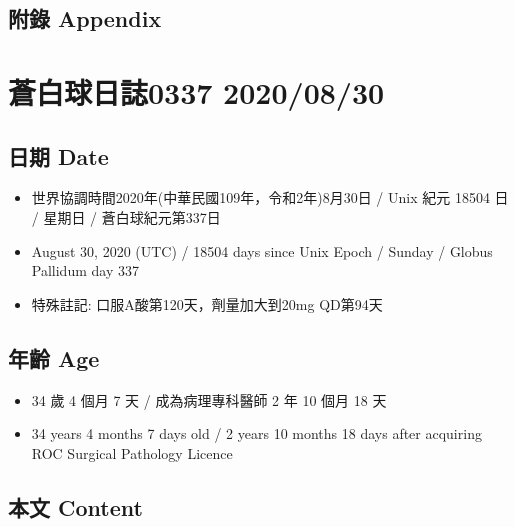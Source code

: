 \documentclass[a5paper, 11pt
]{book}
\providecommand{\tightlist}{%
  \setlength{\itemsep}{0pt}\setlength{\parskip}{0pt}}
\begin{document}
\hypertarget{ux9644ux9304-appendix-89}{%
\subsection{附錄 Appendix}\label{ux9644ux9304-appendix-89}}

\hypertarget{ux84bcux767dux7403ux65e5ux8a8c0337-20200830}{%
\section{蒼白球日誌0337
2020/08/30}\label{ux84bcux767dux7403ux65e5ux8a8c0337-20200830}}

\hypertarget{ux65e5ux671f-date-90}{%
\subsection{日期 Date}\label{ux65e5ux671f-date-90}}

\begin{itemize}
\tightlist
\item
  世界協調時間2020年(中華民國109年，令和2年)8月30日 / Unix 紀元 18504 日
  / 星期日 / 蒼白球紀元第337日
\item
  August 30, 2020 (UTC) / 18504 days since Unix Epoch / Sunday / Globus
  Pallidum day 337
\item
  特殊註記: 口服A酸第120天，劑量加大到20mg QD第94天
\end{itemize}

\hypertarget{ux5e74ux9f61-age-90}{%
\subsection{年齡 Age}\label{ux5e74ux9f61-age-90}}

\begin{itemize}
\tightlist
\item
  34 歲 4 個月 7 天 / 成為病理專科醫師 2 年 10 個月 18 天
\item
  34 years 4 months 7 days old / 2 years 10 months 18 days after
  acquiring ROC Surgical Pathology Licence
\end{itemize}

\hypertarget{ux672cux6587-content-90}{%
\subsection{本文 Content}\label{ux672cux6587-content-90}}
\end{document}
